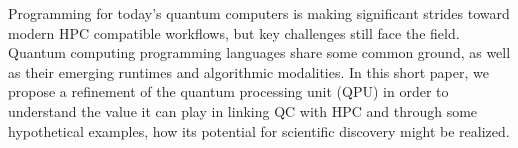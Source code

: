 Programming for today’s quantum computers is making significant strides toward modern HPC compatible workflows, but key challenges still face the field. Quantum computing programming languages share some common ground, as well as their emerging runtimes and algorithmic modalities. In this short paper, we propose a refinement of the quantum processing unit (QPU) in order to understand the value it can play in linking QC with HPC and through some hypothetical examples, how its potential for scientific discovery might be realized. 
